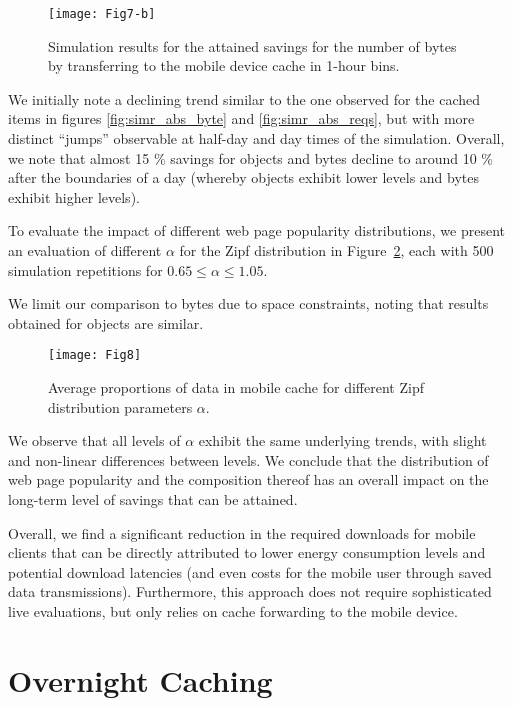 \begin{figure}
	\centering
	\texttt{[image: Fig7-b]}
	\caption{Simulation results for the attained savings for the number of bytes by transferring to the mobile device cache in 1-hour bins.}
	 \label{fig:simr_sav_byte}
\end{figure}

We initially note a declining trend similar to the one observed for the cached items in figures \ref{fig:simr_abs_byte} and \ref{fig:simr_abs_reqs}, but with more distinct ``jumps'' observable at half-day and day times of the simulation.
Overall, we note that almost 15 \% savings for objects and bytes decline to around 10 \% after the boundaries of a day (whereby objects exhibit lower levels and bytes exhibit higher levels).

To evaluate the impact of different web page popularity distributions, we present an evaluation of different $\alpha$ for the Zipf distribution in Figure~\ref{fig:sim3}, each with 500 simulation repetitions for $0.65 \le \alpha \le 1.05$.

We limit our comparison to bytes due to space constraints, noting that results obtained for objects are similar.
\begin{figure}[]
	\centering
	\texttt{[image: Fig8]}
	\caption{Average proportions of data in mobile cache for different Zipf distribution parameters $\alpha$.}
	\label{fig:sim3}
\end{figure}
We observe that all levels of $\alpha$ exhibit the same underlying trends, with slight and non-linear differences between levels.
We conclude that the distribution of web page popularity and the composition thereof has an overall impact on the long-term level of savings that can be attained.

Overall, we find a significant reduction in the required downloads for mobile clients that can be directly attributed to lower energy consumption levels and potential download latencies (and even costs for the mobile user through saved data transmissions).
Furthermore, this approach does not require sophisticated live evaluations, but only relies on cache forwarding to the mobile device.

\section*{Overnight Caching}

